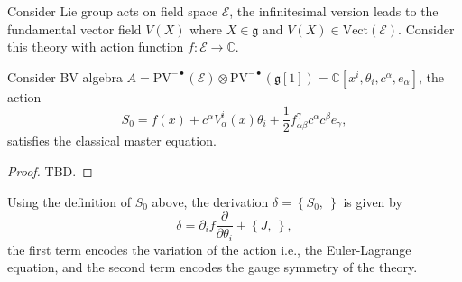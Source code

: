 \documentclass[10pt]{article}
\begin{document}
\begin{example}
  Consider Lie group acts on field space $ \mathcal{E}$, the infinitesimal version leads to the fundamental vector field $ V(X)$ where $ X \in \mathfrak{g}$ and $ V(X) \in \mathrm{Vect}(\mathcal{E})$.
  Consider this theory with action function $ f: \mathcal{E} \rightarrow \mathbb{C}$.

  Consider BV algebra $ A = \mathrm{PV}^{-\bullet}(\mathcal{E}) \otimes \mathrm{PV}^{- \bullet}(\mathfrak{g}[1]) = \mathbb{C}[x^{i}, \theta_{i}, c^{\alpha}, e_{\alpha}]$, the action
  \begin{equation*}
    S_0 = f(x) + c^{\alpha} V_{\alpha}^{i}(x) \theta_{i} + \frac{1}{2} f_{\alpha \beta}^{\gamma} c^{\alpha} c^{\beta} e_{\gamma},
  \end{equation*}
  satisfies the classical master equation.
  \begin{proof}
    TBD.
  \end{proof}
  Using the definition of $ S_0 $ above, the derivation $ \delta = \left\{ S_0, ~ \right\}$ is given by
  \begin{equation*}
    \delta = \partial_{i} f \frac{\partial }{\partial \theta_{i}} + \left\{ J, ~ \right\},
  \end{equation*}
  the first term encodes the variation of the action i.e., the Euler-Lagrange equation, and the second term encodes the gauge symmetry of the theory.
\end{example}

\label{LastPage}
\end{document}
